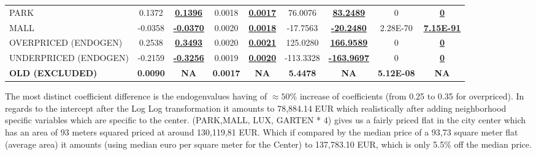 \documentclass[]{article}
\begin{document}
\begin{table}[h!]
{\begin{tabular}{lcccccccc}
			PARK & 0.1372 & \underline{\textbf{0.1396}} & 0.0018 & \underline{\textbf{0.0017}} & 76.0076 & \underline{\textbf{83.2489}} & 0 & \underline{\textbf{0}} \\
			MALL & -0.0358 & \underline{\textbf{-0.0370}} & 0.0020 & \underline{\textbf{0.0018}} & -17.7563 & \underline{\textbf{-20.2480}} & 2.28E-70 & \underline{\textbf{7.15E-91}} \\
			OVERPRICED (ENDOGEN) & 0.2538 & \underline{\textbf{0.3493}} & 0.0020 & \underline{\textbf{0.0021}} & 125.0280 & \underline{\textbf{166.9589}} & 0 & \underline{\textbf{0}} \\
			UNDERPRICED (ENDOGEN) & -0.2159 & \underline{\textbf{-0.3256}} & 0.0019 & \underline{\textbf{0.0020}} & -113.3328 & \underline{\textbf{-163.9697}} & 0 & \underline{\textbf{0}} \\
			\textbf{OLD (EXCLUDED)} & \textbf{0.0090} & \textbf{NA} & \textbf{0.0017} & \textbf{NA} & \textbf{5.4478} & \textbf{NA} & \textbf{5.12E-08} & \textbf{NA} \\
			\hline
		\end{tabular}
	}
\end{table}


The most distinct coefficient difference is the endogenvalues having of $\approx 50\%$ increase of coefficients (from 0.25 to 0.35 for overpriced). In regards to the intercept after the Log Log transformation it amounts to 78,884.14 EUR which realistically after adding neighborhood specific variables which are specific to the center. (PARK,MALL, LUX, GARTEN * 4) gives us a fairly priced flat in the city center which has an area of 93 meters squared priced at around  130,119,81 EUR. Which if compared by the median price of a 93,73 square meter flat (average area) it amounts (using median euro per square meter for the Center) to 137,783.10 EUR, which is only 5.5\% off the median price. 
\end{document}
